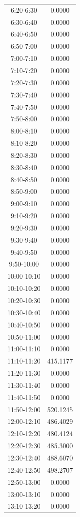 \begin{longtable}{@{}cc@{}}
6:20-6:30 & 0.0000 \\
6:30-6:40 & 0.0000 \\
6:40-6:50 & 0.0000 \\
6:50-7:00 & 0.0000 \\
7:00-7:10 & 0.0000 \\
7:10-7:20 & 0.0000 \\
7:20-7:30 & 0.0000 \\
7:30-7:40 & 0.0000 \\
7:40-7:50 & 0.0000 \\
7:50-8:00 & 0.0000 \\
8:00-8:10 & 0.0000 \\
8:10-8:20 & 0.0000 \\
8:20-8:30 & 0.0000 \\
8:30-8:40 & 0.0000 \\
8:40-8:50 & 0.0000 \\
8:50-9:00 & 0.0000 \\
9:00-9:10 & 0.0000 \\
9:10-9:20 & 0.0000 \\
9:20-9:30 & 0.0000 \\
9:30-9:40 & 0.0000 \\
9:40-9:50 & 0.0000 \\
9:50-10:00 & 0.0000 \\
10:00-10:10 & 0.0000 \\
10:10-10:20 & 0.0000 \\
10:20-10:30 & 0.0000 \\
10:30-10:40 & 0.0000 \\
10:40-10:50 & 0.0000 \\
10:50-11:00 & 0.0000 \\
11:00-11:10 & 0.0000 \\
11:10-11:20 & 415.1177 \\
11:20-11:30 & 0.0000 \\
11:30-11:40 & 0.0000 \\
11:40-11:50 & 0.0000 \\
11:50-12:00 & 520.1245 \\
12:00-12:10 & 486.4029 \\
12:10-12:20 & 480.4124 \\
12:20-12:30 & 485.3000 \\
12:30-12:40 & 488.6070 \\
12:40-12:50 & 498.2707 \\
12:50-13:00 & 0.0000 \\
13:00-13:10 & 0.0000 \\
13:10-13:20 & 0.0000 \\

\end{longtable}
